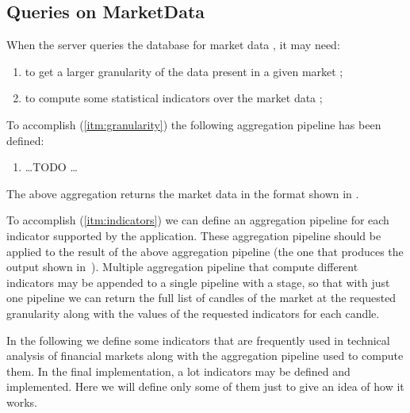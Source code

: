 \subsection{Queries on MarketData}

When the server queries the database for market data , it may need:
\begin{enumerate}
	\item\label{itm:granularity} to get a larger granularity of the data
		present in a given market ;
	\item\label{itm:indicators} to compute some statistical indicators over
		the market data ;
\end{enumerate}

To accomplish (\ref{itm:granularity}) the following aggregation pipeline has
been defined:
\begin{enumerate}
	\item \ldots TODO \ldots
\end{enumerate}

The above aggregation returns the market data in the format shown in
.



To accomplish (\ref{itm:indicators}) we can define an aggregation pipeline for
each indicator supported by the application. These aggregation pipeline should
be applied to the result of the above aggregation pipeline (the one that
produces the output shown in~). Multiple
aggregation pipeline that compute different indicators may be appended to a
single pipeline with a  stage, so that with just one pipeline we
can return the full list of candles of the market at the requested granularity
along with the values of the requested indicators for each candle.

In the following we define some indicators that are frequently used in technical
analysis of financial markets along with the aggregation pipeline used to
compute them. In the final implementation, a lot indicators may be defined and
implemented. Here we will define only some of them just to give an idea of how
it works.

